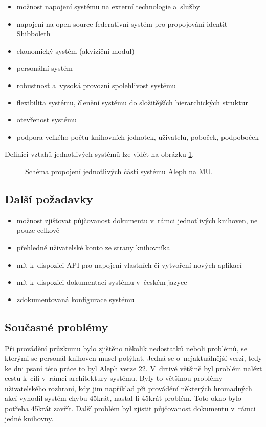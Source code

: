 \documentclass[
	11pt, oneside, printed, final, palatino
	microtype,
	table,   %
	lof,     %
	lot     %
]{fithesis3}
\newcommand{\mezera}{\bigskip}
\begin{document}
{\begin{itemize}
\item možnost napojení systému na externí technologie a~služby
\item napojení na open source federativní systém pro propojování identit Shibboleth
\item ekonomický systém (akviziční modul)
\item personální systém
\item robustnost a~vysoká provozní spolehlivost systému
\item flexibilita systému, členění systému do složitějších hierarchických struktur
\item otevřenost systému
\item podpora velkého počtu knihovních jednotek, uživatelů, poboček, podpoboček
\end{itemize}

Definici vztahů jednotlivých systémů lze vidět na obrázku \ref{fig:aleph}.
\mezera

\begin{figure}
    \centering
	\def\svgwidth{1.4\textwidth}
    
	\caption{Schéma propojení jednotlivých částí systému Aleph na MU.}
	\label{fig:aleph}
\end{figure}

\subsection{Další požadavky}

\begin{itemize}
\item možnost zjišťovat půjčovanost dokumentu v~rámci jednotlivých knihoven, ne pouze celkově
\item přehledné uživatelské konto ze strany knihovníka
\item mít k~dispozici API pro napojení vlastních či vytvoření nových aplikací
\item mít k~dispozici dokumentaci systému v~českém jazyce
\item zdokumentovaná konfigurace systému
\end{itemize}


\subsection{Současné problémy}
Při provádění průzkumu bylo zjištěno několik nedostatků neboli problémů, se kterými se personál knihoven musel potýkat. Jedná se o~nejaktuálnější verzi, tedy ke dni psaní této práce to byl Aleph verze 22. V~drtivé většině byl problém nalézt cestu k~cíli v~rámci architektury systému. Byly to většinou problémy uživatelského rozhraní, kdy jim například při provádění některých hromadných akcí vyhodil systém chybu 45krát, nastal-li 45krát problém. Toto okno bylo potřeba 45krát zavřít. Další problém byl zjistit půjčovanost dokumentu v~rámci jedné knihovny.

}
\end{document}
